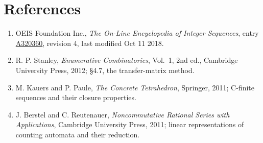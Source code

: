 \documentclass[11pt]{article}
\theoremstyle{definition}
\begin{document}
\section{References}

\begin{enumerate}

\item OEIS Foundation Inc., \emph{The On-Line Encyclopedia of Integer Sequences}, entry \href{https://oeis.org/A320360}{A320360}, revision 4, last modified Oct 11 2018.

\item R. P. Stanley, \emph{Enumerative Combinatorics}, Vol.~1, 2nd ed., Cambridge University Press, 2012; \S4.7, the transfer-matrix method.

\item M. Kauers and P. Paule, \emph{The Concrete Tetrahedron}, Springer, 2011; C-finite sequences and their closure properties.

\item J. Berstel and C. Reutenauer, \emph{Noncommutative Rational Series with Applications}, Cambridge University Press, 2011; linear representations of counting automata and their reduction.

\end{enumerate}
\end{document}
